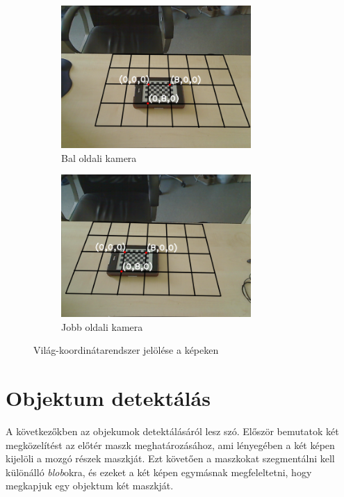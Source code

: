 \begin{figure}[tbh]
\centering
\begin{subfigure}[b]{.49\linewidth}
	\centering
	\includegraphics[width=205pt]{figures/pose0_180.png}
	\caption{Bal oldali kamera}
  \end{subfigure}
\begin{subfigure}[b]{.49\linewidth}
	\centering
	\includegraphics[width=205pt]{figures/pose1_180.png}
	\caption{Jobb oldali kamera}
  \end{subfigure}
\caption{Világ-koordinátarendszer jelölése a képeken \label{fig:pose}}
\end{figure}

\section{Objektum detektálás}

A következőkben az objekumok detektálásáról lesz szó. Először bemutatok két megközelítést az előtér maszk meghatározásához, ami lényegében a két képen kijelöli a mozgó részek maszkját. Ezt követően a maszkokat szegmentálni kell különálló \textit{blob}okra, és ezeket a két képen egymásnak megfeleltetni, hogy megkapjuk egy objektum két maszkját.


